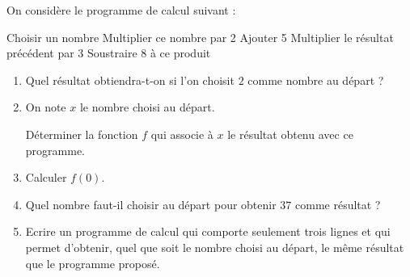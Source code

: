 
%
On considère le programme de calcul suivant :
 \begin{code}
     Choisir un nombre
     Multiplier ce nombre par 2
     Ajouter 5
     Multiplier le résultat précédent par 3
     Soustraire 8 à ce produit
 \end{code}
\begin{enumerate}
     \item
     Quel résultat obtiendra-t-on si l'on choisit $2$ comme nombre au départ ?
     \item
     On note $x$ le nombre choisi au départ.
     \par
     Déterminer la fonction $f$ qui associe à $x$ le résultat obtenu avec ce programme.
     \item
     Calculer $f\left(0\right)$.
     \item
     Quel nombre faut-il choisir au départ pour obtenir $37$ comme résultat ?
     \item
     Ecrire un programme de calcul qui comporte seulement trois lignes et qui permet d'obtenir, quel que soit le nombre choisi au départ, le même résultat que le programme proposé.
\end{enumerate}
